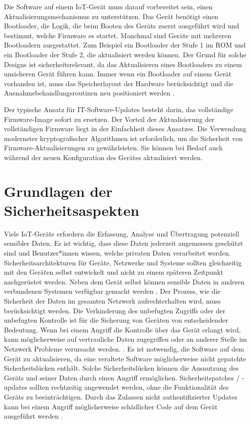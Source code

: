 Die Software auf einem IoT-Gerät muss darauf vorbereitet sein, einen Aktualisierungsmechanismus zu unterstützen. Das Gerät benötigt einen Bootloader, die Logik, die beim Booten des Geräts zuerst ausgeführt wird und bestimmt, welche Firmware es startet. Manchmal sind Geräte mit mehreren Bootloadern ausgestattet. Zum Beispiel ein Bootloader der Stufe 1 im ROM und ein Bootloader der Stufe 2, die aktualisiert werden können. Der Grund für solche Designs ist sicherheitsrelevant, da das Aktualisieren eines Bootloaders zu einem unsicheren Gerät führen kann. Immer wenn ein Bootloader auf einem Gerät vorhanden ist, muss das Speicherlayout der Hardware berücksichtigt und die Ausnahmebehandlungsroutinen neu positioniert werden \cite[p.3]{website:SecureFirmware}.

Der typische Ansatz für IT-Software-Updates besteht darin, das vollständige Firmware-Image sofort zu ersetzen. Der Vorteil der Aktualisierung der vollständigen Firmware liegt in der Einfachheit dieses Ansatzes. Die Verwendung modernster kryptografischer Algorithmen ist erforderlich, um die Sicherheit von Firmware-Aktualisierungen zu gewährleisten. Sie können bei Bedarf auch während der neuen Konfiguration des Gerätes aktualisiert werden. 

\chapter{Grundlagen der Sicherheitsaspekten}
\label{sec:sicher}
Viele IoT-Geräte erfordern die Erfassung, Analyse und Übertragung potenziell sensibler Daten. Es ist wichtig, dass diese Daten jederzeit angemessen geschützt sind und Benutzer*innen wissen, welche privaten Daten verarbeitet werden. Sicherheitsarchitekturen für Geräte, Netzwerke und Systeme sollten gleichzeitig mit den Geräten selbst entwickelt und nicht zu einem späteren Zeitpunkt nachgerüstet werden. Neben dem Gerät selbst können sensible Daten in anderen verbundenen Systemen verfügbar gemacht werden \cite[p.5]{website:Principles}. Der Prozess, wie die Sicherheit der Daten im gesamten Netzwerk aufrechterhalten wird, muss berücksichtigt werden. Die Verhinderung des unbefugten Zugriffs oder der unbefugten Kontrolle ist für die Sicherung von Geräten von entscheidender Bedeutung. Wenn bei einem Angriff die Kontrolle über das Gerät erlangt wird, kann möglicherweise auf vertrauliche Daten zugegriffen oder an anderer Stelle im Netzwerk Probleme verursacht werden. \cite[p.11]{website:Principles}. Es ist notwendig, die Software auf dem Gerät zu aktualisieren, da eine veraltete Software möglicherweise nicht gepatchte Sicherheitslücken enthält. Solche Sicherheitslücken können die Ausnutzung des Geräts und seiner Daten durch einen Angriff ermöglichen. Sicherheitspatches / -updates sollten rechtzeitig angewendet werden, ohne die Funktionalität des Geräts zu beeinträchtigen. Durch das Zulassen nicht authentifizierter Updates kann bei einem Angriff möglicherweise schädlicher Code auf dem Gerät ausgeführt werden \cite[p.12]{website:Principles}.

